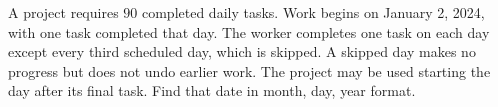 A project requires $90$ completed daily tasks. Work begins on January 2, 2024, with one task completed that day. The worker completes one task on each day except every third scheduled day, which is skipped. A skipped day makes no progress but does not undo earlier work. The project may be used starting the day after its final task. Find that date in month, day, year format.

